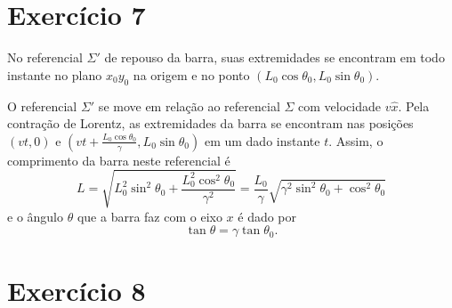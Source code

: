 \documentclass[12pt,a4paper]{article}
\numberwithin{equation}{section}
\begin{document}
\section*{Exercício 7}
No referencial \(\Sigma'\) de repouso da barra, suas extremidades se encontram em todo instante no plano \(x_0y_0\) na origem e no ponto \((L_0 \cos\theta_0, L_0 \sin \theta_0)\).

O referencial \(\Sigma'\) se move em relação ao referencial \(\Sigma\) com velocidade \(v\hat{x}\). Pela contração de Lorentz, as extremidades da barra se encontram nas posições \(\left(vt,0\right)\) e \(\left(vt + \frac{L_0\cos\theta_0}{\gamma}, L_0\sin\theta_0\right)\) em um dado instante \(t\). Assim, o comprimento da barra neste referencial é
\begin{equation*}
    L = \sqrt{L_0^2\sin^2\theta_0 + \frac{L_0^2\cos^2\theta_0}{\gamma^2}} = \frac{L_0}{\gamma} \sqrt{\gamma^2\sin^2\theta_0 + \cos^2\theta_0}
\end{equation*}
e o ângulo \(\theta\) que a barra faz com o eixo \(x\) é dado por
\begin{equation*}
    \tan \theta = \gamma \tan \theta_0.
\end{equation*}

\section*{Exercício 8}
\end{document}
